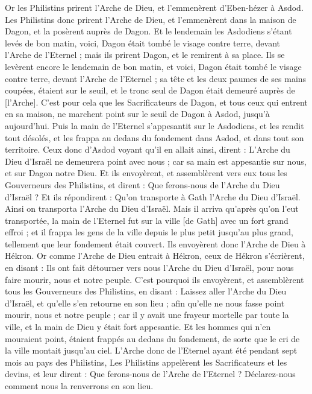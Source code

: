 \begin{multicols}{2}
\VerseOne{}Or les Philistins prirent l'Arche de Dieu, et l'emmenèrent d'Eben-hézer à Asdod.
Les Philistins donc prirent l'Arche de Dieu, et l'emmenèrent dans la maison de Dagon, et la posèrent auprès de Dagon.
Et le lendemain les Asdodiens s'étant levés de bon matin, voici, Dagon était tombé le visage contre terre, devant l'Arche de l'Eternel ; mais ils prirent Dagon, et le remirent à sa place.
Ils se levèrent encore le lendemain de bon matin, et voici, Dagon était tombé le visage contre terre, devant l'Arche de l'Eternel ; sa tête et les deux paumes de ses mains coupées, étaient sur le seuil, et le tronc seul de Dagon était demeuré auprès de [l'Arche].
C'est pour cela que les Sacrificateurs de Dagon, et tous ceux qui entrent en sa maison, ne marchent point sur le seuil de Dagon à Asdod, jusqu'à aujourd'hui.
Puis la main de l'Eternel s'appesantit sur le Asdodiens, et les rendit tout désolés, et les frappa au dedans du fondement dans Asdod, et dans tout son territoire.
Ceux donc d'Asdod voyant qu'il en allait ainsi, dirent : L'Arche du Dieu d'Israël ne demeurera point avec nous ; car sa main est appesantie sur nous, et sur Dagon notre Dieu.
Et ils envoyèrent, et assemblèrent vers eux tous les Gouverneurs des Philistins, et dirent : Que ferons-nous de l'Arche du Dieu d'Israël ? Et ils répondirent : Qu'on transporte à Gath l'Arche du Dieu d'Israël. Ainsi on transporta l'Arche du Dieu d'Israël.
Mais il arriva qu'après qu'on l'eut transportée, la main de l'Eternel fut sur la ville [de Gath] avec un fort grand effroi ; et il frappa les gens de la ville depuis le plus petit jusqu'au plus grand, tellement que leur fondement était couvert.
Ils envoyèrent donc l'Arche de Dieu à Hékron. Or comme l'Arche de Dieu entrait à Hékron, ceux de Hékron s'écrièrent, en disant : Ils ont fait détourner vers nous l'Arche du Dieu d'Israël, pour nous faire mourir, nous et notre peuple.
C'est pourquoi ils envoyèrent, et assemblèrent tous les Gouverneurs des Philistins, en disant : Laissez aller l'Arche du Dieu d'Israël, et qu'elle s'en retourne en son lieu ; afin qu'elle ne nous fasse point mourir, nous et notre peuple ; car il y avait une frayeur mortelle par toute la ville, et la main de Dieu y était fort appesantie.
Et les hommes qui n'en mouraient point, étaient frappés au dedans du fondement, de sorte que le cri de la ville montait jusqu'au ciel.
\VerseOne{}L'Arche donc de l'Eternel ayant été pendant sept mois au pays des Philistins,
Les Philistins appelèrent les Sacrificateurs et les devins, et leur dirent : Que ferons-nous de l'Arche de l'Eternel ? Déclarez-nous comment nous la renverrons en son lieu.

\end{multicols}
